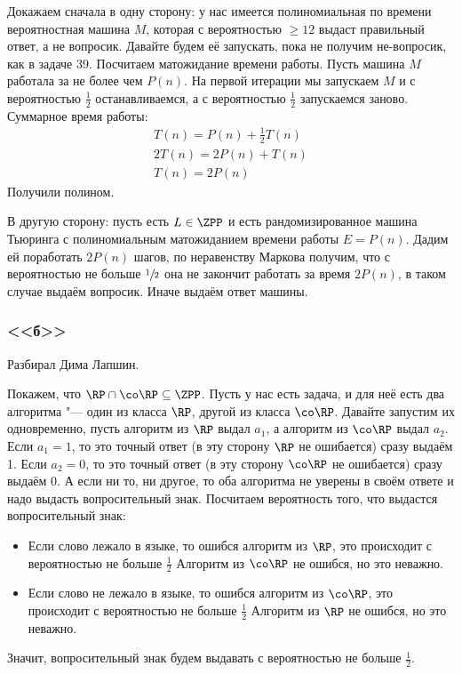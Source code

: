     Докажаем сначала в одну сторону: у нас имеется полиномиальная по времени
    вероятностная машина $M$, которая с вероятностью $\ge 12$ выдаст правильный ответ, а не вопросик.
    Давайте будем её запускать, пока не получим не-вопросик, как в задаче 39.
    Посчитаем матожидание времени работы.
    Пусть машина $M$ работала за не более чем $P(n)$.
    На первой итерации мы запускаем $M$ и с вероятностью $\frac 12$ останавливаемся, а с вероятностью $\frac 12$ запускаемся заново.
    Суммарное время работы:
    \begin{align*}
    	T(n) = P(n) + \frac12 T(n) \\
    	2T(n) = 2P(n) + T(n) \\
    	T(n) = 2P(n)
	\end{align*}
	Получили полином.

	В другую сторону: пусть есть $L \in \ZPP$ и есть рандомизированное машина Тьюринга
	с полиномиальным матожиданием времени работы $E=P(n)$.
	Дадим ей поработать $2P(n)$ шагов, по неравенству Маркова получим, что с вероятностью не больше $\sfrac 12$
	она не закончит работать за время $2P(n)$, в таком случае выдаём вопросик.
	Иначе выдаём ответ машины.

\subsubsection{<<б>>}
	Разбирал Дима Лапшин.

	Покажем, что $\RP \cap \co\RP \subseteq \ZPP$.
	Пусть у нас есть задача, и для неё есть два алгоритма "--- один из класса $\RP$, другой из класса $\co\RP$.
	Давайте запустим их одновременно, пусть алгоритм из $\RP$ выдал $a_1$, а алгоритм из $\co\RP$ выдал $a_2$.
	Если $a_1=1$, то это точный ответ (в эту сторону $\RP$ не ошибается) сразу выдаём 1.
	Если $a_2=0$, то это точный ответ (в эту сторону $\co\RP$ не ошибается) сразу выдаём 0.
	А если ни то, ни другое, то оба алгоритма не уверены в своём ответе и надо выдасть вопросительный знак.
	Посчитаем вероятность того, что выдастся вопросительный знак:
	\begin{itemize}
		\item
			Если слово лежало в языке, то ошибся алгоритм из $\RP$, это происходит с вероятностью не больше $\frac 12$
			Алгоритм из $\co\RP$ не ошибся, но это неважно.
		\item
			Если слово не лежало в языке, то ошибся алгоритм из $\co\RP$, это происходит с вероятностью не больше $\frac 12$
			Алгоритм из $\RP$ не ошибся, но это неважно.
	\end{itemize}
	Значит, вопросительный знак будем выдавать с вероятностью не больше $\frac 1 2$.

